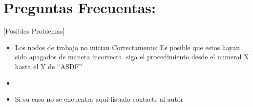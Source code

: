 \section{Preguntas Frecuentas:}[Posibles Problemas]

\begin{itemize}
	\item Los nodos de trabajo no inician Correctamente: Es posible que estos hayan sido apagados de manera incorrecta. 
	siga el procedimiento desde el numeral X hasta el Y de ``ASDF''

	\item 
	\item Si su caso no se encuentra aquí listado contacte al autor
\end{itemize}




